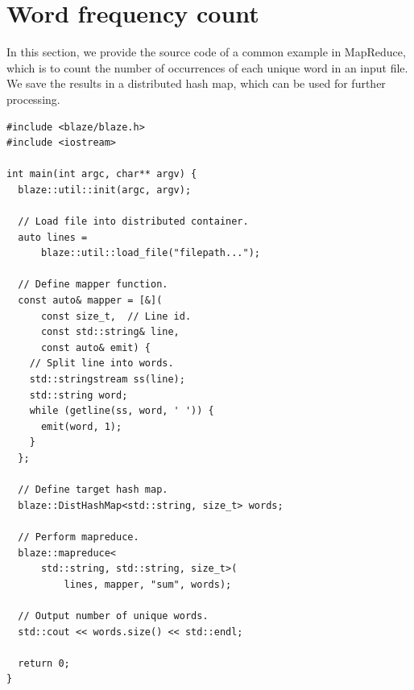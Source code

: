 \documentclass{sigkddExp}
\begin{document}

%

%
%
\appendix
\section{Word frequency count}
In this section, we provide the source code of a common example in MapReduce, which is to count the number of occurrences of each unique word in an input file.
We save the results in a distributed hash map, which can be used for further processing.

\begin{lstlisting}
#include <blaze/blaze.h>
#include <iostream>

int main(int argc, char** argv) {
  blaze::util::init(argc, argv);
  
  // Load file into distributed container.
  auto lines =
      blaze::util::load_file("filepath...");

  // Define mapper function.
  const auto& mapper = [&](
      const size_t,  // Line id.
      const std::string& line,
      const auto& emit) {
    // Split line into words.
    std::stringstream ss(line);
    std::string word;
    while (getline(ss, word, ' ')) {
      emit(word, 1);
    }
  };

  // Define target hash map.
  blaze::DistHashMap<std::string, size_t> words;

  // Perform mapreduce.
  blaze::mapreduce<
      std::string, std::string, size_t>(
          lines, mapper, "sum", words);
    
  // Output number of unique words.
  std::cout << words.size() << std::endl;
  
  return 0;
}
\end{lstlisting}
\end{document}
